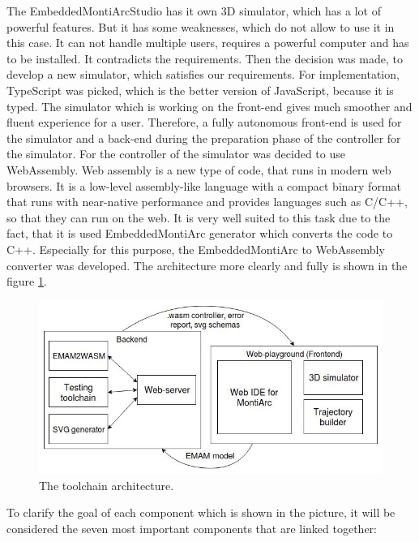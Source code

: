 The EmbeddedMontiArcStudio has it own 3D simulator, which has a lot of powerful features. But it has some weaknesses, which do not allow to use it in this case. It can not handle multiple users, requires a powerful computer and has to be installed. It contradicts the requirements. Then the decision was made, to develop a new simulator, which satisfies our requirements. For implementation, TypeScript was picked, which is the better version of JavaScript, because it is typed. The simulator which is working on the front-end gives much smoother and fluent experience for a user. Therefore, a fully autonomous front-end is used for the simulator and a back-end during the preparation phase of the controller for the simulator. For the controller of the simulator was decided to use WebAssembly. Web assembly is a new type of code, that runs in modern web browsers. It is a low-level assembly-like language with a compact binary format that runs with near-native performance and provides languages such as C/C++, so that they can run on the web. It is very well suited to this task due to the fact, that it is used EmbeddedMontiArc generator which converts the code to C++. Especially for this purpose, the EmbeddedMontiArc to WebAssembly converter was developed. The architecture more clearly and fully is shown in the figure \ref{fig:architecture}.
\begin{figure}[h!]
    \centering
    \includegraphics[width=\linewidth]{src/pic/architecture}
    \caption{The toolchain architecture.}
    \label{fig:architecture}
\end{figure} \newline
To clarify the goal of each component which is shown in the picture, it will be considered the seven most important components that are linked together:
